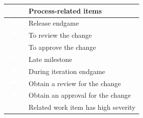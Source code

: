 \documentclass[12pt,oneside]{book}
\begin{document}
\addtocounter{table}{1}
\begin{table}[t!]
\centering
\begin{tabular}{ll}
\toprule
\vspace{-2pt}& Process-related items\\
\midrule
\vspace{-2pt}\includegraphics[height=10px, width=30px]{figures/sparkles/during-release-endgame.pdf} & Release endgame\\
\vspace{-2pt}\includegraphics[height=10px, width=30px]{figures/sparkles/you-need-to-review-a-change.pdf} & To review the change\\
\vspace{-2pt}\includegraphics[height=10px, width=30px]{figures/sparkles/you-need-to-approve-a-change.pdf} & To approve the change\\
\vspace{-2pt}\includegraphics[height=10px, width=30px]{figures/sparkles/late-milestone.pdf} & Late milestone\\
\vspace{-2pt}\includegraphics[height=10px, width=30px]{figures/sparkles/during-iteration-endgame.pdf} & During iteration endgame\\
\vspace{-2pt}\includegraphics[height=10px, width=30px]{figures/sparkles/you-need-a-review-for-a-change.pdf} & Obtain a review for the change\\
\vspace{-2pt}\includegraphics[height=10px, width=30px]{figures/sparkles/you-need-an-approval-for-a-change.pdf} & Obtain an approval for the change\\
\vspace{-2pt}\includegraphics[height=10px, width=30px]{figures/sparkles/related-work-item-has-high-severity.pdf} & Related work item has high severity\\

\end{tabular}
\end{table}
\end{document}
